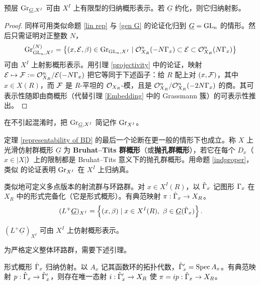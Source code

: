 \begin{thm}\label{representability of BD}
预层 ${\operatorname{Gr}}_{\underline G, X^I}$ 可由 $X^I$ 上有限型的归纳概形表示。若 $\underline G$ 约化，则它归纳射影。
\end{thm}

\begin{proof}
同样可用类似命题 \ref{lin rep} 与 \ref{gen G} 的论证化归到 $\underline G={\operatorname{GL}}_n$ 的情形。然后只需证明对正整数 $N$，
\[{\operatorname{Gr}}_{{\operatorname{GL}}_n,X^I}^{(N)}=\left\{(x,{\mathcal E},\beta)\in{\operatorname{Gr}}_{{\operatorname{GL}}_n,X^I}\mid {\mathcal O}_{X_R}^n(-N{\Gamma}_x)\subset {\mathcal E}\subset {\mathcal O}_{X_R}^{n}(N{\Gamma}_x)\right\}\]
可由 $X^I$ 上射影概形表示。用引理 \ref{projectivity} 中的论证，映射 ${\mathcal E}\mapsto {\mathcal F}:={\mathcal O}_{X_R}^{n}/{\mathcal E}(-N{\Gamma}_x)$ 把它等同于下述函子：给 $R$ 配上对 $(x,{\mathcal F})$，其中 $x\in X(R)$，而 ${\mathcal F}$ 是 $R$-平坦的 ${\mathcal O}_{X_R}$-模，且是 ${\mathcal O}_{X_R}^n/{\mathcal O}_{X_R}^n(-2N{\Gamma}_x)$ 的商。其可表示性随即由商概形（代替引理 \ref{Embedding} 中的 Grassmann 簇）的可表示性推出。
\end{proof}

在不引起混淆时，把 ${\operatorname{Gr}}_{\underline G,X^I}$ 简记作 ${\operatorname{Gr}}_{X^I}$。

\begin{rmk}\label{projectivity of BD}
定理 \ref{representability of BD} 的最后一个论断在更一般的情形下也成立。称 $X$ 上光滑仿射群概形 $\underline G$ 为 \textbf{Bruhat--Tits 群概形}（或\textbf{抛孔群概形}），若它在每个 $D_x$（$x\in |X|$）上的限制都是 Bruhat--Tits 意义下的抛孔群概形。用命题 \ref{indproper}，类似 \cite{PZ} 的论证表明 ${\operatorname{Gr}}_{X^I}$ 在 $X^I$ 上归纳真。
\end{rmk}

类似地可定义多点版本的射流群与环路群。对 $x\in X^I(R)$，以 $\hat{{\Gamma}}_x$ 记图形 ${\Gamma}_x$ 在 $X_R$ 中的形式完备化（它是形式概形）。有典范映射 $\pi:\hat{{\Gamma}}_x\to X_R$。
\begin{equation}
(L^+\underline G)_{X^I}=\left\{(x,\beta)\mid x\in X^I(R),\ \beta\in
\underline{G}(\hat{{\Gamma}}_x)\right\}.
\end{equation}

\begin{prop}
$(L^+\underline{G})_{X^I}$ 可由 $X^I$ 上仿射概形表示。
\end{prop}

为严格定义整体环路群，需要下述引理。

\begin{lem}
形式概形 $\hat{{\Gamma}}_x$ 归纳仿射。以 $A_x$ 记其函数环的拓扑代数，$\hat{{\Gamma}}'_x=\operatorname{Spec} A_x$。有典范映射 $p:\hat{{\Gamma}}_x\to\hat{{\Gamma}}'_x$，则存在唯一态射 $i: \hat{{\Gamma}}'_x\to X_R$ 使 $\pi=ip:\hat{{\Gamma}}_x\to X_R$。
\end{lem}

